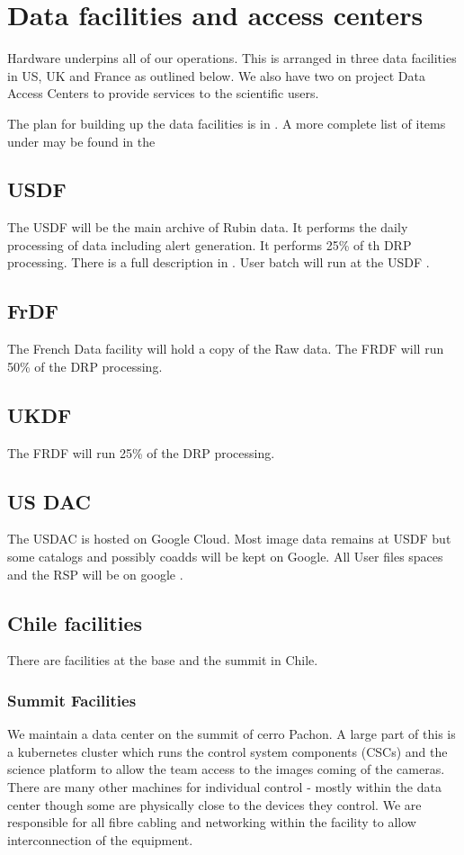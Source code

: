 \section{Data facilities and access centers} \label{sec:datafacilities}
Hardware underpins all of our operations.
This is arranged in three data facilities in US, UK and France as outlined below.
We also have two on project Data Access Centers to provide services to the scientific users.

The plan for building up the data facilities is in .
A more complete list of items under may be found in the 

\subsection{USDF}
The USDF will be the main archive of Rubin data. It performs the daily processing of data including alert generation.
It performs 25\% of th DRP processing.
There is a full description in .
User batch will run at the USDF .

\subsection{FrDF}
The French Data facility will hold a copy of the Raw data.
The FRDF will run 50\% of the DRP processing.

\subsection{UKDF}
The FRDF will run 25\% of the DRP processing.

\subsection{US DAC}
The USDAC is hosted on Google Cloud.
Most image data remains at USDF but some catalogs and possibly coadds will be kept on Google.
All User files spaces and the RSP will be on google .

\subsection{Chile facilities}\label{sec:chilefacilities}
There are facilities at the base and the summit in Chile.

\subsubsection{Summit Facilities}
We maintain a data center on the summit of cerro Pachon.
A large part of this is a kubernetes cluster which runs the control system components (CSCs) and the science platform to allow the team access to the images coming of the cameras.
There are many other machines for individual control - mostly within the data center though some are physically close to the devices they control.
We are responsible for all fibre cabling and networking  within the facility to allow interconnection of the equipment.


